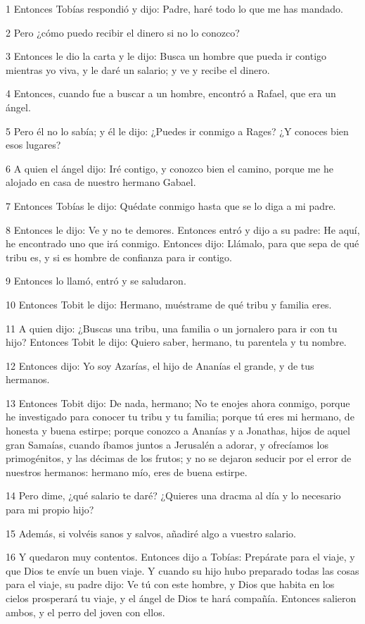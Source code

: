 \par 1 Entonces Tobías respondió y dijo: Padre, haré todo lo que me has mandado.
\par 2 Pero ¿cómo puedo recibir el dinero si no lo conozco?
\par 3 Entonces le dio la carta y le dijo: Busca un hombre que pueda ir contigo mientras yo viva, y le daré un salario; y ve y recibe el dinero.
\par 4 Entonces, cuando fue a buscar a un hombre, encontró a Rafael, que era un ángel.
\par 5 Pero él no lo sabía; y él le dijo: ¿Puedes ir conmigo a Rages? ¿Y conoces bien esos lugares?
\par 6 A quien el ángel dijo: Iré contigo, y conozco bien el camino, porque me he alojado en casa de nuestro hermano Gabael.
\par 7 Entonces Tobías le dijo: Quédate conmigo hasta que se lo diga a mi padre.
\par 8 Entonces le dijo: Ve y no te demores. Entonces entró y dijo a su padre: He aquí, he encontrado uno que irá conmigo. Entonces dijo: Llámalo, para que sepa de qué tribu es, y si es hombre de confianza para ir contigo.
\par 9 Entonces lo llamó, entró y se saludaron.
\par 10 Entonces Tobit le dijo: Hermano, muéstrame de qué tribu y familia eres.
\par 11 A quien dijo: ¿Buscas una tribu, una familia o un jornalero para ir con tu hijo? Entonces Tobit le dijo: Quiero saber, hermano, tu parentela y tu nombre.
\par 12 Entonces dijo: Yo soy Azarías, el hijo de Ananías el grande, y de tus hermanos.
\par 13 Entonces Tobit dijo: De nada, hermano; No te enojes ahora conmigo, porque he investigado para conocer tu tribu y tu familia; porque tú eres mi hermano, de honesta y buena estirpe; porque conozco a Ananías y a Jonathas, hijos de aquel gran Samaías, cuando íbamos juntos a Jerusalén a adorar, y ofrecíamos los primogénitos, y las décimas de los frutos; y no se dejaron seducir por el error de nuestros hermanos: hermano mío, eres de buena estirpe.
\par 14 Pero dime, ¿qué salario te daré? ¿Quieres una dracma al día y lo necesario para mi propio hijo?
\par 15 Además, si volvéis sanos y salvos, añadiré algo a vuestro salario.
\par 16 Y quedaron muy contentos. Entonces dijo a Tobías: Prepárate para el viaje, y que Dios te envíe un buen viaje. Y cuando su hijo hubo preparado todas las cosas para el viaje, su padre dijo: Ve tú con este hombre, y Dios que habita en los cielos prosperará tu viaje, y el ángel de Dios te hará compañía. Entonces salieron ambos, y el perro del joven con ellos.
